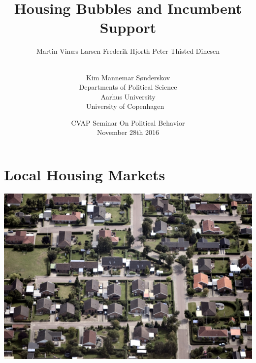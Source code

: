 \documentclass[aspectratio=169]{beamer}
\title[Local Housing Markets]{Housing Bubbles and Incumbent Support}
\author[Larsen et al.]{Martin Vinæs Larsen \qquad Frederik Hjorth \qquad Peter Thisted  Dinesen  \and  \\ Kim Mannemar  Sønderskov \vspace{0.1in}  \\Departments of Political Science \\ Aarhus University \\ University of Copenhagen \ }
\date[Sept. 2nd 2016]{CVAP Seminar On Political Behavior \\ November 28th 2016}
\begin{document}
	
	\begin{frame}
		\titlepage
	\end{frame}
	
	\begin{frame}
		\tableofcontents

	\end{frame}
	
	
		\AtBeginSection[]{\begin{frame}
				\tableofcontents[currentsection] 
			\end{frame}}
			

\section{Local Housing Markets}
\begin{frame}
\includegraphics[width=1\textwidth]{../../figures/villakvarter.jpg}
\end{frame}
\end{document}
